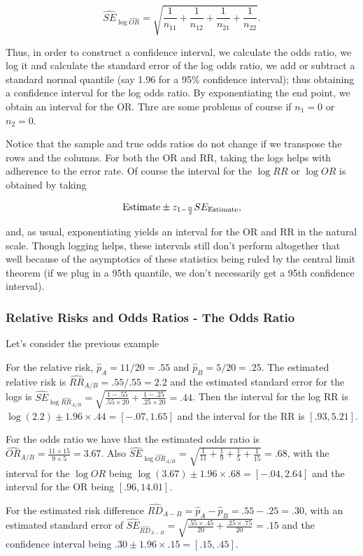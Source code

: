 \documentclass{homework}
\begin{document}
$$
\hat{SE}_{\log \hat{OR}}=\sqrt{\frac{1}{n_{11}}+\frac{1}{n_{12}}+\frac{1}{n_{21}}+\frac{1}{n_{22}}}.
$$

Thus, in order to construct a confidence interval, we calculate the odds ratio, we log it and calculate the standard error of the log odds ratio, we add or subtract a standard normal quantile (say 1.96 for a 95\% confidence interval); thus obtaining a confidence interval for the log odds ratio. By exponentiating the end point, we obtain an interval for the OR. Thre are some problems of course if $n_1 = 0$ or $n_2 = 0$. 

Notice that the sample and true odds ratios do not change if we transpose the rows and the columns. For both the OR and RR, taking the logs helps with adherence to the error rate. Of course the interval for the $\log RR$ or $\log OR$ is obtained by taking

$$
\textnormal{Estimate} \pm z_{1-\frac{\alpha}{2}} SE_{\textnormal{Estimate}},
$$

and, as usual, exponentiating yields an interval for the OR and RR in the natural scale. Though logging helps, these intervals still don't perform altogether that well because of the asymptotics of these statistics being ruled by the central limit theorem (if we plug in a 95th quantile, we don't necessarily get a 95th confidence interval). 

\clearpage

\subsubsection{Relative Risks and Odds Ratios - The Odds Ratio}

Let's consider the previous example

\begin{tcolorbox}[title=Exampled continued]

For the relative risk, $\hat{p}_A = 11/20 = .55$ and $\hat{p}_B = 5/20 = .25$. The estimated relative risk is $\hat{RR}_{A/B} = .55/.55 = 2.2$ and the estimated standard error for the logs is $\hat{SE}_{\log \hat{RR}_{A/B}} = \sqrt{\frac{1-.55}{.55 \times 20}+\frac{1-.25}{.25 \times 20}} = .44$. Then the interval for the log RR is $\log(2.2) \pm 1.96 \times .44 = [-.07, 1.65]$ and the interval for the RR is $[.93, 5.21]$.

For the odds ratio we have that the estimated odds ratio is $\hat{OR}_{A/B} = \frac{11\times15}{9 \times 5} = 3.67$. Also $\hat{SE}_{\log \hat{OR}_{A/B}} = \sqrt{\frac{1}{11}+\frac{1}{9}+\frac{1}{5}+\frac{1}{15}} = .68$, with the interval for the $\log OR$ being $\log(3.67) \pm 1.96\times .68 = [-.04, 2.64]$ and the interval for the OR being $[.96, 14.01]$.

For the estimated risk difference $\hat{RD}_{A-B} = \hat{p}_A - \hat{p}_B = .55 - .25 = .30$, with an estimated standard error of 
$\hat{SE}_{\hat{RD}_{A-B}} = \sqrt{\frac{.55 \times .45}{20}+\frac{.25 \times .75}{20}} = .15$ and the confidence interval being $.30\pm 1.96 \times .15 = [.15, .45]$.

\end{tcolorbox}
\end{document}
